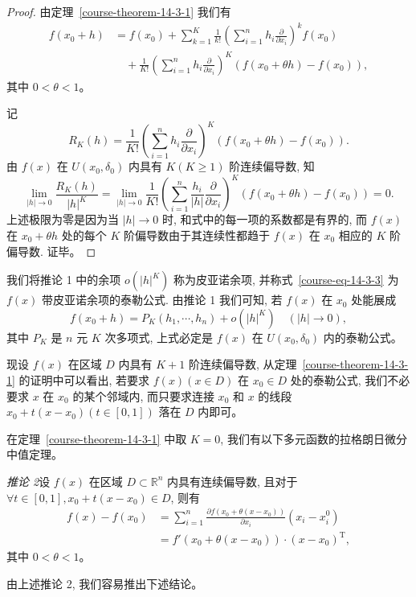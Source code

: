 \documentclass[UTF8,12pt,a4paper,fontset=fandol]{ctexart}
\begin{document}
\begin{proof}\quad 由定理~\ref{course-theorem-14-3-1}  我们有
\[
\begin{aligned}
  f(x_0+h)
  &=f(x_0)+\sum_{k=1}^K\frac1{k!}
  \left(\sum_{i=1}^n h_i\frac{\partial}{\partial x_i}\right)^kf(x_0)\\
  &\quad+\frac1{K!}
  \left(\sum_{i=1}^n h_i\frac{\partial}{\partial x_i}\right)^K
  (f(x_0+\theta h)-f(x_0)),
\end{aligned}
\]
其中 $0<\theta<1$。

记
\[
  R_K(h)=\frac1{K!}
  \left(\sum_{i=1}^n h_i\frac{\partial}{\partial x_i}\right)^K
  (f(x_0+\theta h)-f(x_0)).
\]
由 $f(x)$ 在 $U(x_0,\delta_0)$ 内具有 $K(K\geqslant1)$ 阶连续偏导数, 知
\[
  \lim_{|h|\to0}\frac{R_K(h)}{|h|^K}
  =\lim_{|h|\to0}\frac1{K!}
  \left(\sum_{i=1}^n\frac{h_i}{|h|}\frac{\partial}{\partial x_i}\right)^K
  (f(x_0+\theta h)-f(x_0))=0.
\]
上述极限为零是因为当 $|h|\to0$ 时, 和式中的每一项的系数都是有界的, 而 $f(x)$ 在 $x_0+\theta h$ 处的每个 $K$ 阶偏导数由于其连续性都趋于 $f(x)$ 在 $x_0$ 相应的 $K$ 阶偏导数. 证毕。

\end{proof}
\begin{remark}\quad 我们将推论 1 中的余项 $o(|h|^K)$ 称为皮亚诺余项, 并称式~\eqref{course-eq-14-3-3}  为 $f(x)$ 带皮亚诺余项的泰勒公式. 由推论 1 我们可知, 若 $f(x)$ 在 $x_0$ 处能展成
\[
  f(x_0+h)=P_K(h_1,\cdots,h_n)+o(|h|^K)
  \quad(|h|\to0),
\]
其中 $P_K$ 是 $n$ 元 $K$ 次多项式, 上式必定是 $f(x)$ 在 $U(x_0,\delta_0)$ 内的泰勒公式。

现设 $f(x)$ 在区域 $D$ 内具有 $K+1$ 阶连续偏导数, 从定理~\ref{course-theorem-14-3-1}  的证明中可以看出, 若要求 $f(x)(x\in D)$ 在 $x_0\in D$ 处的泰勒公式, 我们不必要求 $x$ 在 $x_0$ 的某个邻域内, 而只要求连接 $x_0$ 和 $x$ 的线段 $x_0+t(x-x_0)(t\in[0,1])$ 落在 $D$ 内即可。

在定理~\ref{course-theorem-14-3-1}  中取 $K=0$, 我们有以下多元函数的拉格朗日微分中值定理。

\end{remark}
\noindent\emph{推论 2}\quad 设 $f(x)$ 在区域 $D\subset\mathbb R^n$ 内具有连续偏导数, 且对于 $\forall t\in[0,1],x_0+t(x-x_0)\in D$, 则有
\[
\begin{aligned}
  f(x)-f(x_0)
  &=\sum_{i=1}^n
  \frac{\partial f(x_0+\theta(x-x_0))}{\partial x_i}(x_i-x_i^0)\\
  &=f'(x_0+\theta(x-x_0))\cdot(x-x_0)^\mathrm T,
\end{aligned}
\]
其中 $0<\theta<1$。

由上述推论 2, 我们容易推出下述结论。
\end{document}
